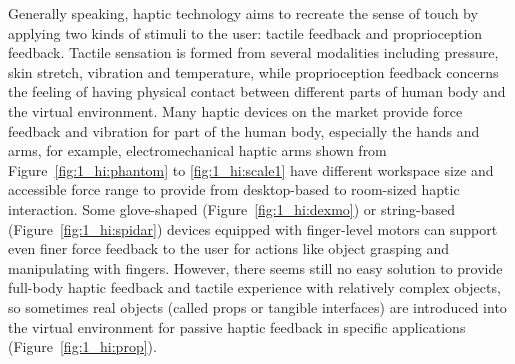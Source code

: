 Generally speaking, haptic technology aims to recreate the sense of touch by applying two kinds of stimuli to the user: tactile feedback and proprioception feedback. Tactile sensation is formed from several modalities including pressure, skin stretch, vibration and temperature, while proprioception feedback concerns the feeling of having physical contact between different parts of human body and the virtual environment. Many haptic devices on the market provide force feedback and vibration for part of the human body, especially the hands and arms, for example, electromechanical haptic arms shown from Figure~\ref{fig:1_hi:phantom} to \ref{fig:1_hi:scale1} have different workspace size and accessible force range to provide from desktop-based to room-sized haptic interaction. Some glove-shaped (Figure~\ref{fig:1_hi:dexmo}) or string-based (Figure~\ref{fig:1_hi:spidar}) devices equipped with finger-level motors can support even finer force feedback to the user for actions like object grasping and manipulating with fingers. However, there seems still no easy solution to provide full-body haptic feedback and tactile experience with relatively complex objects, so sometimes real objects (called props or tangible interfaces) are introduced into the virtual environment for passive haptic feedback in specific applications (Figure~\ref{fig:1_hi:prop}).

